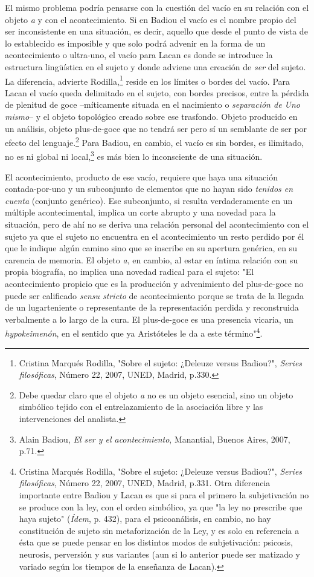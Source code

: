 El mismo problema podría pensarse con la cuestión del vacío en su
relación con el objeto \emph{a} y con el acontecimiento. Si en Badiou el
vacío es el nombre propio del ser inconsistente en una situación, es
decir, aquello que desde el punto de vista de lo establecido es
imposible y que solo podrá advenir en la forma de un acontecimiento o
ultra-uno, el vacío para Lacan es donde se introduce la estructura
lingüística en el sujeto y donde adviene una creación de \emph{ser} del
sujeto. La diferencia, advierte Rodilla,\footnote{Cristina Marqués
  Rodilla, "Sobre el sujeto: ¿Deleuze versus Badiou?", \emph{Series
  filosóficas}, Número 22, 2007, UNED, Madrid, p.330.} reside en los
límites o bordes del vacío. Para Lacan el vacío queda delimitado en el
sujeto, con bordes precisos, entre la pérdida de plenitud de goce
--míticamente situada en el nacimiento o \emph{separación de Uno
mismo}-- y el objeto topológico creado sobre ese trasfondo. Objeto
producido en un análisis, objeto plus-de-goce que no tendrá ser pero sí
un semblante de ser por efecto del lenguaje.\footnote{Debe quedar claro
  que el objeto \emph{a} no es un objeto esencial, sino un objeto
  simbólico tejido con el entrelazamiento de la asociación libre y las
  intervenciones del analista.} Para Badiou, en cambio, el vacío es sin
bordes, es ilimitado, no es ni global ni local,\footnote{Alain Badiou,
  \emph{El ser y el acontecimiento}, Manantial, Buenos Aires, 2007,
  p.71.} es más bien lo inconsciente de una situación.

El acontecimiento, producto de ese vacío, requiere que haya una
situación contada-por-uno y un subconjunto de elementos que no hayan
sido \emph{tenidos en cuenta} (conjunto genérico). Ese subconjunto, si
resulta verdaderamente en un múltiple acontecimental, implica un corte
abrupto y una novedad para la situación, pero de ahí no se deriva una
relación personal del acontecimiento con el sujeto ya que el sujeto no
encuentra en el acontecimiento un resto perdido por él que le indique
algún camino sino que se inscribe en su apertura genérica, en su
carencia de memoria. El objeto \emph{a}, en cambio, al estar en íntima
relación con su propia biografía, no implica una novedad radical para el
sujeto: "El acontecimiento propicio que es la producción y advenimiento
del plus-de-goce no puede ser calificado \emph{sensu stricto} de
acontecimiento porque se trata de la llegada de un lugarteniente o
representante de la representación perdida y reconstruida verbalmente a
lo largo de la cura. El plus-de-goce es una presencia vicaria, un
\emph{hypokeimenón}, en el sentido que ya Aristóteles le da a este
término"\footnote{Cristina Marqués Rodilla, "Sobre el sujeto: ¿Deleuze
  versus Badiou?", \emph{Series filosóficas}, Número 22, 2007, UNED,
  Madrid, p.331. Otra diferencia importante entre Badiou y Lacan es que
  si para el primero la subjetivación no se produce con la ley, con el
  orden simbólico, ya que "la ley no prescribe que haya sujeto"
  (\emph{Ídem}, p. 432), para el psicoanálisis, en cambio, no hay
  constitución de sujeto sin metaforización de la Ley, y es solo en
  referencia a ésta que se puede pensar en los distintos modos de
  subjetivación: psicosis, neurosis, perversión y sus variantes (aun si
  lo anterior puede ser matizado y variado según los tiempos de la
  enseñanza de Lacan).}.

